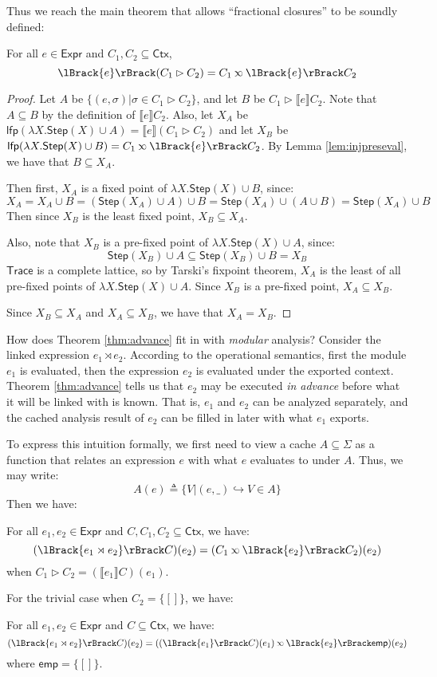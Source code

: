 \documentclass[acmsmall,screen,review]{acmart}\settopmatter{printfolios=true,printccs=false,printacmref=false}
\theoremstyle{acmdefinition}
\newcommand*{\Expr}{\mathsf{Expr}}
\newcommand*{\ctx}{\sigma}
\newcommand*{\Ctx}{\mathsf{Ctx}}
\newcommand*{\Trace}{\mathsf{Trace}}
\newcommand*{\lfp}{\mathsf{lfp}}
\newcommand*{\Step}{\mathsf{Step}}
\newcommand*{\semarrow}{\hookrightarrow}
\newcommand*{\semlink}{\mathbin{\rotatebox[origin=c]{180}{$\propto$}}}
\newcommand*{\link}[2]{{#1}\rtimes{#2}}
\newcommand*{\mt}{\mathsf{emp}}
\newcommand*{\sembracket}[1]{\lBrack{#1}\rBrack}
\begin{document}
Thus we reach the main theorem that allows ``fractional closures'' to be soundly defined:
\begin{theorem}[Advance]\label{thm:advance}
  For all $e\in\Expr$ and $C_1,C_2\subseteq\Ctx$,
  \[\sembracket{e}(C_1\rhd C_2)=C_1\semlink\sembracket{e}C_2\]
\end{theorem}
\begin{proof}
  Let $A$ be $\{(e,\ctx)|\ctx\in C_1\rhd C_2\}$, and let $B$ be $C_1\rhd\sembracket{e}C_2$.
  Note that $A\subseteq B$ by the definition of $\sembracket{e}C_2$.
  Also, let $X_A$ be $\lfp(\lambda X.\Step(X)\cup A)=\sembracket{e}(C_1\rhd C_2)$ and let $X_B$ be $\lfp(\lambda X.\Step(X)\cup B)=C_1\semlink\sembracket{e}C_2$.
  By Lemma \ref{lem:injpreseval}, we have that $B\subseteq X_A$.

  Then first, $X_A$ is a fixed point of $\lambda X.\Step(X)\cup B$, since:
  \[X_A=X_A\cup B=(\Step(X_A)\cup A)\cup B=\Step(X_A)\cup(A\cup B)=\Step(X_A)\cup B\]
  Then since $X_B$ is the least fixed point, $X_B\subseteq X_A$.

  Also, note that $X_B$ is a pre-fixed point of $\lambda X.\Step(X)\cup A$, since:
  \[\Step(X_B)\cup A\subseteq\Step(X_B)\cup B=X_B\]
  $\Trace$ is a complete lattice, so by Tarski's fixpoint theorem, $X_A$ is the least of all pre-fixed points of $\lambda X.\Step(X)\cup A$.
  Since $X_B$ is a pre-fixed point, $X_A\subseteq X_B$.

  Since $X_B\subseteq X_A$ and $X_A\subseteq X_B$, we have that $X_A=X_B$.
\end{proof}

How does Theorem \ref{thm:advance} fit in with \emph{modular} analysis?
Consider the linked expression $\link{e_1}{e_2}$.
According to the operational semantics, first the module $e_1$ is evaluated, then the expression $e_2$ is evaluated under the exported context.
Theorem \ref{thm:advance} tells us that $e_2$ may be executed \emph{in advance} before what it will be linked with is known.
That is, $e_1$ and $e_2$ can be analyzed separately, and the cached analysis result of $e_2$ can be filled in later with what $e_1$ exports.

To express this intuition formally, we first need to view a cache $A\subseteq\Sigma$ as a function that relates an expression $e$ with what $e$ evaluates to under $A$.
Thus, we may write:
\[A(e)\triangleq\{V|(e,\_)\semarrow V\in A\}\]
Then we have:
\begin{corollary} For all $e_1,e_2\in\Expr$ and $C,C_1,C_2\subseteq\Ctx$, we have:
  \[(\sembracket{\link{e_1}{e_2}}C)(e_2)=(C_1\semlink\sembracket{e_2}C_2)(e_2)\]
  when $C_1\rhd C_2=(\sembracket{e_1}C)(e_1)$.
\end{corollary}
For the trivial case when $C_2=\{[]\}$, we have:
\begin{corollary} For all $e_1,e_2\in\Expr$ and $C\subseteq\Ctx$, we have:
  \[(\sembracket{\link{e_1}{e_2}}C)(e_2)=((\sembracket{e_1}C)(e_1)\semlink\sembracket{e_2}\mt)(e_2)\]
  where $\mt=\{[]\}$.
\end{corollary}
\end{document}
